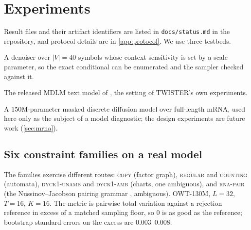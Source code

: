 \documentclass[11pt]{article}
\theoremstyle{definition}
\begin{document}
\section{Experiments}\label{sec:experiments}
Result files and their artifact identifiers are listed in \texttt{docs/status.md} in the repository, and protocol
details are in \cref{app:protocol}. We use three testbeds.

\begin{description}[leftmargin=1.6em,itemsep=2pt]
\item[Synthetic.] A denoiser over $|V|=40$ symbols whose context sensitivity is set by a scale parameter, so the
  exact conditional can be enumerated and the sampler checked against it.
\item[OWT-130M.] The released MDLM text model of \cite{sahoo2024}, the setting of TWISTER's own experiments.
\item[mRNAutilus.] A 150M-parameter masked discrete diffusion model over full-length mRNA, used here only as the
  subject of a model diagnostic; the design experiments are future work (\cref{sec:mrna}).
\end{description}

\subsection{Six constraint families on a real model}\label{sec:expe1}
The families exercise different routes: \textsc{copy} (factor graph), \textsc{regular} and
\textsc{counting} (automata), \textsc{dyck1-unamb} and \textsc{dyck1-amb} (charts, one ambiguous), and
\textsc{rna-pair} (the Nussinov--Jacobson pairing grammar \cite{nussinov1980}, ambiguous). OWT-130M, $L=32$,
$T=16$, $K=16$. The metric is pairwise total variation against a rejection reference in excess of a matched
sampling floor, so 0 is as good as the reference; bootstrap standard errors on the excess are $0.003$--$0.008$.
\end{document}
